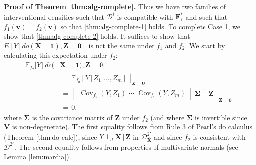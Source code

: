 \documentclass[11pt]{article}
\DeclareMathOperator{\Cov}{Cov}
\newcommand{\mb}[1]{\mathbf{#1}}
\newcommand{\dsepp}{\perp_{d}}
\newcommand{\g}[1][G]{\mathcal{#1}}
\newcommand{\E}{\mathbb{E}}
\newenvironment{proofofnoqed}[1][]{\noindent \textbf{Proof of #1.}}{}
\begin{document}
\begin{proofofnoqed}[Theorem \ref{thm:alg-complete}]
    Thus we have two families of interventional densities such that $\g[D]^i$ is compatible with $\mb{F^*_i}$ and such that $f_1(\mb{v})=f_2(\mb{v})$ so that \eqref{thm:alg-complete-1} holds. To complete Case 1, we show that \eqref{thm:alg-complete-2} holds. It suffices to show that $E[Y \,|\, do(\mb{X}=\mb{1}), \mb{Z}=\mb{0}]$ is not the same under $f_1$ and $f_2$. We start by calculating this expectation under $f_2$:
    \begin{align*}
        \E_{f_2}[Y \,|\, do(&\mb{X}=\mb{1}), \mb{Z} = \mb{0}]\\
            &\,=\, \left. \E_{f_2}[Y \,|\, Z_1, \dots, Z_m] \,\, \right\rvert_{\, \mb{Z}=\mb{0}}\\
            &\,=\, \left. \begin{bmatrix}
                                \Cov_{f_2}(Y, Z_1) \,\, \cdots \,\, \Cov_{f_2}(Y, Z_m) 
                          \end{bmatrix}
                          \, \mb{\Sigma}^{-1}
                          \,\, \mb{Z} \,\, \right\rvert_{\, \mb{Z}=\mb{0}}\\
            &\,=\, 0,
    \end{align*}
    where $\mb{\Sigma}$ is the covariance matrix of $\mb{Z}$ under $f_2$ (and where $\mb{\Sigma}$ is invertible since $\mb{V}$ is non-degenerate). The first equality follows from Rule 3 of Pearl's do calculus (Theorem \ref{thm:do-calc}), since $Y \dsepp \mb{X} \,|\, \mb{Z}$ in $\g[D]^{2'}_{\overline{\mb{X}}}$ and since $f_2$ is consistent with $\g[D]^{2'}$. The second equality follows from properties of multivariate normals (see Lemma \ref{lem:mardia}).


\end{proofofnoqed}
\end{document}
